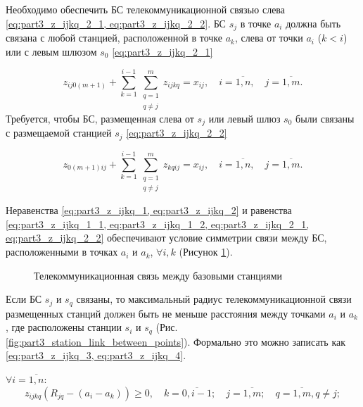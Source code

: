 Необходимо обеспечить БС телекоммуникационной связью слева \cref{eq:part3_z_ijkq_2_1, eq:part3_z_ijkq_2_2}. БС $ s_j $ в точке $ a_i $ должна быть связана с  любой станцией, расположенной в точке $ a_k $, слева от точки $ a_i $ ($ k <i $) или с левым шлюзом $ s_{0}$ \cref{eq:part3_z_ijkq_2_1} 

\begin{equation}
  \label{eq:part3_z_ijkq_2_1}
  z_{ij0(m+1)} + \sum\limits_{k=1}^{i-1} \sum\limits_{\substack{q = 1\\ q \neq j}}^m z_{ijkq}= x_{ij}, \quad i = \overline{1, n}, \quad j = \overline{1, m}.
\end{equation}
Требуется, чтобы БС, размещенная слева от $s_j$ или левый шлюз $ s_{0} $  были связаны с размещаемой станцией $ s_j $ \cref{eq:part3_z_ijkq_2_2}

\begin{equation}
  \label{eq:part3_z_ijkq_2_2}
    z_{0(m+1)ij} +  \sum\limits_{k=1}^{i-1} \sum\limits_{\substack{q = 1 \\ q \neq j}}^m z_{kqij}= x_{ij},  \quad i = \overline{1, n}, \quad j = \overline{1, m}.
\end{equation}


Неравенства \cref{eq:part3_z_ijkq_1, eq:part3_z_ijkq_2} и равенства \cref{eq:part3_z_ijkq_1_1, eq:part3_z_ijkq_1_2, eq:part3_z_ijkq_2_1, eq:part3_z_ijkq_2_2} обеспечивают условие симметрии связи между БС, расположенными в точках $ a_i $ и $ a_k $, $\forall i, k $ (Рисунок \cref{fig:part3_station_link}).

\begin{figure}[ht]
  \caption{Телекоммуникационная связь между базовыми станциями}\label{fig:part3_station_link}
\end{figure}

Если БС $ s_j $ и $ s_q $ связаны, то максимальный радиус телекоммуникационной связи размещенных станций должен быть не меньше расстояния между точками $ a_i $ и $ a_k $, где расположены станции $ s_i $ и $ s_q $ (Рис. \cref{fig:part3_station_link_between_points}). Формально это можно записать как \cref{eq:part3_z_ijkq_3, eq:part3_z_ijkq_4}.

 $\forall i= \overline{1,n}$:
\begin{equation}
  \label{eq:part3_z_ijkq_3}
  z_{ijkq}(R_{jq}-(a_i-a_k ))\geq 0, \quad k=\overline{0,i-1}; \quad j=\overline{1,m}; \quad q= \overline{1,m}, q \neq j; 
\end{equation}

